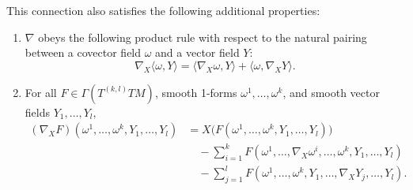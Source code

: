 \begin{proposition}
This connection also satisfies the following additional properties:
\begin{enumerate}
\item[(a)] $\nabla$ obeys the following product rule with respect to the natural pairing between a covector field $\omega$ and a vector field $Y$:
\[\nabla_X \langle \omega, Y \rangle = \langle \nabla_X \omega, Y \rangle + \langle \omega, \nabla_X Y \rangle.\]
\item[(b)] For all $F \in \Gamma(T^{(k,l)}TM)$, smooth 1-forms $\omega^1, \ldots, \omega^k$, and smooth vector fields $Y_1, \ldots, Y_l$,
\begin{align}
  (\nabla_X F)(\omega^1,\ldots,\omega^k, Y_1,\ldots,Y_l) &= X\big(F(\omega^1,\ldots,\omega^k, Y_1,\ldots,Y_l)\big) \nonumber\\
  &\quad - \sum_{i=1}^{k} F(\omega^1,\ldots,\nabla_X\omega^i,\ldots,\omega^k, Y_1,\ldots,Y_l) \nonumber\\
  &\quad - \sum_{j=1}^{l} F(\omega^1,\ldots,\omega^k, Y_1,\ldots,\nabla_X Y_j,\ldots,Y_l). \label{eq:4.12}\tag{4.12}
\end{align}
\end{enumerate}
\end{proposition}

